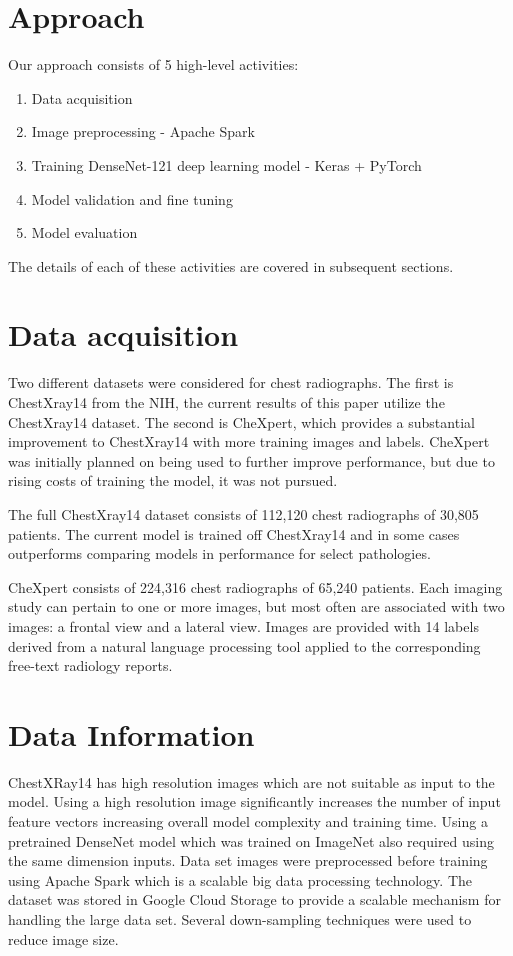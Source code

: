 \documentclass{amia}
\begin{document}
\section*{Approach}

Our approach consists of 5 high-level activities:
\begin{enumerate}
\item Data acquisition
\item Image preprocessing - Apache Spark
\item Training DenseNet-121 deep learning model - Keras + PyTorch
\item Model validation and fine tuning
\item Model evaluation
\end{enumerate}

The details of each of these activities are covered in subsequent sections.

\section*{Data acquisition}
Two different datasets were considered for chest radiographs. The first is ChestXray14 from the NIH, the current results of this paper utilize the ChestXray14 dataset. The second is CheXpert, which provides a substantial improvement to ChestXray14 with more training images and labels. CheXpert was initially planned on being used to further improve performance, but due to rising costs of training the model, it was not pursued.

The full ChestXray14 dataset consists of 112,120 chest radiographs of 30,805 patients. The current model is trained off ChestXray14 and in some cases outperforms comparing models in performance for select pathologies.

CheXpert\cite{ref2} consists of 224,316 chest radiographs of 65,240 patients. Each imaging study can pertain to one or more images, but most often are associated with two images: a frontal view and a lateral view. Images are provided with 14 labels derived from a natural language processing tool applied to the corresponding free-text radiology reports.

\section*{Data Information}

ChestXRay14 has high resolution images which are not suitable as input to the model. Using a high resolution image significantly increases the number of input feature vectors increasing overall model complexity and training time. Using a pretrained DenseNet model which was trained on ImageNet also required using the same dimension inputs. Data set images were preprocessed before training using Apache Spark which is a scalable big data processing technology. The dataset was stored in Google Cloud Storage to provide a scalable mechanism for handling the large data set. Several down-sampling techniques were used to reduce image size.
\end{document}
